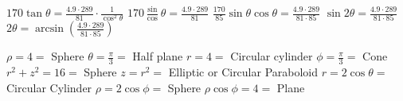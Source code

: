 \documentclass[12pt]{article}
\begin{document}
\begin{paracol}{2}
\begin{fleqn}
            $170\tan\theta = \frac{4.9 \cdot 289}{81} \cdot \frac{1}{\cos^2\theta}$ \guillemotright
            $170 \frac{\sin}{\cos}\theta = \frac{4.9\cdot289}{81}$ \newline
            $\frac{170}{85}\sin\theta\cos\theta = \frac{4.9\cdot289}{81\cdot85}$ \guillemotright
            $\sin 2\theta = \frac{4.9\cdot289}{81\cdot85}$ \newline
            $2 \theta = \arcsin(\frac{4.9\cdot289}{81\cdot85})$ \newline
        \end{fleqn}
        \newline
        \begin{fleqn}
            $\rho = 4 = $  Sphere \newline
            $\theta = \frac{\pi}{3} = $ Half plane \newline
            $r = 4 = $ Circular cylinder \newline
            $\phi = \frac{\pi}{3} = $ Cone \newline
            $r^2 + z^2 = 16 =$ Sphere \newline
            $z = r^2 = $ Elliptic or Circular Paraboloid \newline
            $r = 2 \cos\theta = $ Circular Cylinder \newline
            $\rho = 2 \cos\phi = $ Sphere \newline
            $\rho \cos\phi = 4 =$ Plane \newline
        \end{fleqn}
    \end{paracol}
\end{document}
